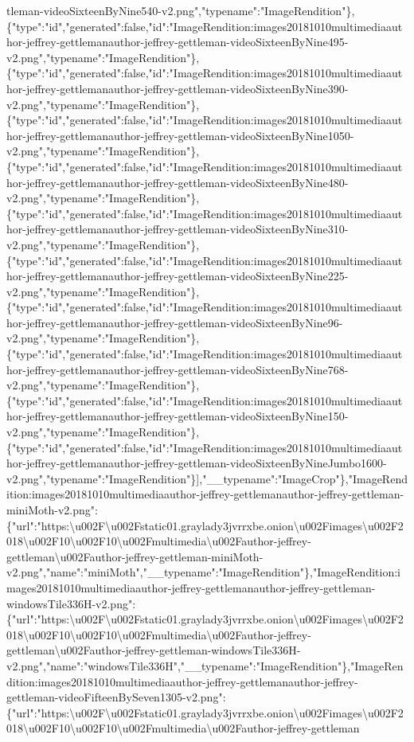 tleman-videoSixteenByNine540-v2.png","typename":"ImageRendition"\},\{"type":"id","generated":false,"id":"ImageRendition:images20181010multimediaauthor-jeffrey-gettlemanauthor-jeffrey-gettleman-videoSixteenByNine495-v2.png","typename":"ImageRendition"\},\{"type":"id","generated":false,"id":"ImageRendition:images20181010multimediaauthor-jeffrey-gettlemanauthor-jeffrey-gettleman-videoSixteenByNine390-v2.png","typename":"ImageRendition"\},\{"type":"id","generated":false,"id":"ImageRendition:images20181010multimediaauthor-jeffrey-gettlemanauthor-jeffrey-gettleman-videoSixteenByNine1050-v2.png","typename":"ImageRendition"\},\{"type":"id","generated":false,"id":"ImageRendition:images20181010multimediaauthor-jeffrey-gettlemanauthor-jeffrey-gettleman-videoSixteenByNine480-v2.png","typename":"ImageRendition"\},\{"type":"id","generated":false,"id":"ImageRendition:images20181010multimediaauthor-jeffrey-gettlemanauthor-jeffrey-gettleman-videoSixteenByNine310-v2.png","typename":"ImageRendition"\},\{"type":"id","generated":false,"id":"ImageRendition:images20181010multimediaauthor-jeffrey-gettlemanauthor-jeffrey-gettleman-videoSixteenByNine225-v2.png","typename":"ImageRendition"\},\{"type":"id","generated":false,"id":"ImageRendition:images20181010multimediaauthor-jeffrey-gettlemanauthor-jeffrey-gettleman-videoSixteenByNine96-v2.png","typename":"ImageRendition"\},\{"type":"id","generated":false,"id":"ImageRendition:images20181010multimediaauthor-jeffrey-gettlemanauthor-jeffrey-gettleman-videoSixteenByNine768-v2.png","typename":"ImageRendition"\},\{"type":"id","generated":false,"id":"ImageRendition:images20181010multimediaauthor-jeffrey-gettlemanauthor-jeffrey-gettleman-videoSixteenByNine150-v2.png","typename":"ImageRendition"\},\{"type":"id","generated":false,"id":"ImageRendition:images20181010multimediaauthor-jeffrey-gettlemanauthor-jeffrey-gettleman-videoSixteenByNineJumbo1600-v2.png","typename":"ImageRendition"\}{]},"\_\_typename":"ImageCrop"\},"ImageRendition:images20181010multimediaauthor-jeffrey-gettlemanauthor-jeffrey-gettleman-miniMoth-v2.png":\{"url":"https:\textbackslash{}u002F\textbackslash{}u002Fstatic01.graylady3jvrrxbe.onion\textbackslash{}u002Fimages\textbackslash{}u002F2018\textbackslash{}u002F10\textbackslash{}u002F10\textbackslash{}u002Fmultimedia\textbackslash{}u002Fauthor-jeffrey-gettleman\textbackslash{}u002Fauthor-jeffrey-gettleman-miniMoth-v2.png","name":"miniMoth","\_\_typename":"ImageRendition"\},"ImageRendition:images20181010multimediaauthor-jeffrey-gettlemanauthor-jeffrey-gettleman-windowsTile336H-v2.png":\{"url":"https:\textbackslash{}u002F\textbackslash{}u002Fstatic01.graylady3jvrrxbe.onion\textbackslash{}u002Fimages\textbackslash{}u002F2018\textbackslash{}u002F10\textbackslash{}u002F10\textbackslash{}u002Fmultimedia\textbackslash{}u002Fauthor-jeffrey-gettleman\textbackslash{}u002Fauthor-jeffrey-gettleman-windowsTile336H-v2.png","name":"windowsTile336H","\_\_typename":"ImageRendition"\},"ImageRendition:images20181010multimediaauthor-jeffrey-gettlemanauthor-jeffrey-gettleman-videoFifteenBySeven1305-v2.png":\{"url":"https:\textbackslash{}u002F\textbackslash{}u002Fstatic01.graylady3jvrrxbe.onion\textbackslash{}u002Fimages\textbackslash{}u002F2018\textbackslash{}u002F10\textbackslash{}u002F10\textbackslash{}u002Fmultimedia\textbackslash{}u002Fauthor-jeffrey-gettleman\